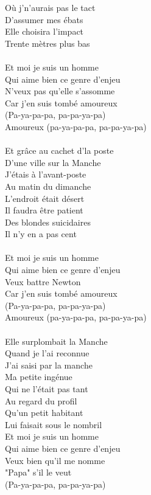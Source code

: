 Où j'n'aurais pas le tact\\
D'assumer mes ébats\\
Elle choisira l'impact\\
Trente mètres plus bas\\\\
Et moi je suis un homme\\
Qui aime bien ce genre d'enjeu\\
N'veux pas qu'elle s'assomme\\
Car j'en suis tombé amoureux\\
(Pa-ya-pa-pa, pa-pa-ya-pa)\\
Amoureux (pa-ya-pa-pa, pa-pa-ya-pa)\\\\
Et grâce au cachet d'la poste\\
D'une ville sur la Manche\\
J'étais à l'avant-poste\\
Au matin du dimanche\\
L'endroit était désert\\
Il faudra être patient\\
Des blondes suicidaires\\
Il n'y en a pas cent\\\\
Et moi je suis un homme\\
Qui aime bien ce genre d'enjeu\\
Veux battre Newton\\
Car j'en suis tombé amoureux\\
(Pa-ya-pa-pa, pa-pa-ya-pa)\\
Amoureux (pa-ya-pa-pa, pa-pa-ya-pa)\\\\
Elle surplombait la Manche\\
Quand je l'ai reconnue\\
J'ai saisi par la manche\\
Ma petite ingénue\\
Qui ne l'était pas tant\\
Au regard du profil\\
Qu'un petit habitant\\
Lui faisait sous le nombril\\
Et moi je suis un homme\\
Qui aime bien ce genre d'enjeu\\
Veux bien qu'il me nomme\\
"Papa" s'il le veut\\
(Pa-ya-pa-pa, pa-pa-ya-pa)\\
